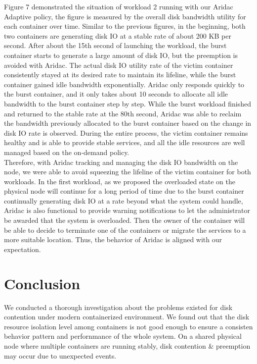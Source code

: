 \documentclass[10pt, conference,compsoc]{IEEEtran}
\begin{document}
Figure 7 demonstrated the situation of workload 2 running with our Aridac Adaptive policy, the figure is measured by the overall disk bandwidth utility for each container over time. Similar to the previous figures, in the beginning, both two containers are generating disk IO at a stable rate of about 200 KB per second. After about the 15th second of launching the workload, the burst container starts to generate a large amount of disk IO, but the preemption is avoided with Aridac. The actual disk IO utility rate of the victim container consistently stayed at its desired rate to maintain its lifeline, while the burst container gained idle bandwidth exponentially. Aridac only responds quickly to the burst container, and it only takes about 10 seconds to allocate all idle bandwidth to the burst container step by step. While the burst workload finished and returned to the stable rate at the 80th second, Aridac was able to reclaim the bandwidth previously allocated to the burst container based on the change in disk IO rate is observed. During the entire process, the victim container remains healthy and is able to provide stable services, and all the idle resources are well managed based on the on-demand policy.\\

Therefore, with Aridac tracking and managing the disk IO bandwidth on the node, we were able to avoid squeezing the lifeline of the victim container for both workloads. In the first workload, as we proposed the overloaded state on the physical node will continue for a long period of time due to the burst container continually generating disk IO at a rate beyond what the system could handle, Aridac is also functional to provide warning notifications to let the administrator be awarded that the system is overloaded. Then the owner of the container will be able to decide to terminate one of the containers or migrate the services to a more suitable location. Thus, the behavior of Aridac is aligned with our expectation.\\





\section{Conclusion}
We conducted a thorough investigation about the problems existed for disk contention under modern containerized environment. We found out that the disk resource isolation level among containers is not good enough to ensure a consisten behavior pattern and perfornmance of the whole system. On a shared physical node where multiple containers are running stably, disk contention \& preemption may occur due to unexpected events.\\
\end{document}

